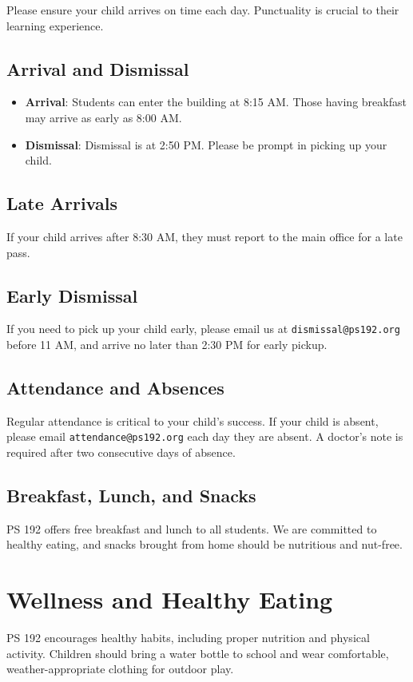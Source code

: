 \documentclass[11pt]{article}
\begin{document}
Please ensure your child arrives on time each day. Punctuality is crucial to their learning experience.

\subsection{Arrival and Dismissal}
\label{sec:org0a938ce}
\begin{itemize}
\item \textbf{\textbf{Arrival}}: Students can enter the building at 8:15 AM. Those having breakfast may arrive as early as 8:00 AM.
\item \textbf{\textbf{Dismissal}}: Dismissal is at 2:50 PM. Please be prompt in picking up your child.
\end{itemize}

\subsection{Late Arrivals}
\label{sec:orgfec3b88}
If your child arrives after 8:30 AM, they must report to the main office for a late pass.

\subsection{Early Dismissal}
\label{sec:orgb534b81}
If you need to pick up your child early, please email us at \texttt{dismissal@ps192.org} before 11 AM, and arrive no later than 2:30 PM for early pickup.

\subsection{Attendance and Absences}
\label{sec:orgae5d8b5}
Regular attendance is critical to your child's success. If your child is absent, please email \texttt{attendance@ps192.org} each day they are absent. A doctor's note is required after two consecutive days of absence.

\subsection{Breakfast, Lunch, and Snacks}
\label{sec:orge11dba2}
PS 192 offers free breakfast and lunch to all students. We are committed to healthy eating, and snacks brought from home should be nutritious and nut-free.

\section{Wellness and Healthy Eating}
\label{sec:orgf252f78}
PS 192 encourages healthy habits, including proper nutrition and physical activity. Children should bring a water bottle to school and wear comfortable, weather-appropriate clothing for outdoor play.
\end{document}
